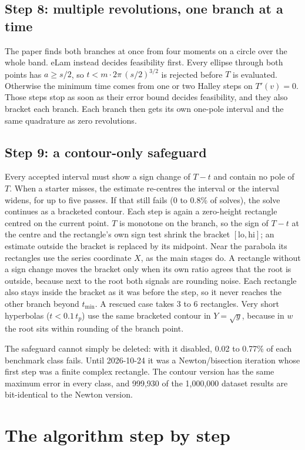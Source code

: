 \documentclass[11pt]{article}
\begin{document}
\subsection*{Step 8: multiple revolutions, one branch at a time}
The paper finds both branches at once from four moments on a circle over the whole band. eLam instead decides feasibility first. Every ellipse through both points has $a \ge s/2$, so $t < m\cdot2\pi\,(s/2)^{3/2}$ is rejected before $T$ is evaluated. Otherwise the minimum time comes from one or two Halley steps on $T'(v)=0$. Those steps stop as soon as their error bound decides feasibility, and they also bracket each branch. Each branch then gets its own one-pole interval and the same quadrature as zero revolutions.

\subsection*{Step 9: a contour-only safeguard}
Every accepted interval must show a sign change of $T-t$ and contain no pole of $T$. When a starter misses, the estimate re-centres the interval or the interval widens, for up to five passes. If that still fails (0 to 0.8\% of solves), the solve continues as a bracketed contour. Each step is again a zero-height rectangle centred on the current point. $T$ is monotone on the branch, so the sign of $T-t$ at the centre and the rectangle's own sign test shrink the bracket $[\text{lo},\text{hi}]$; an estimate outside the bracket is replaced by its midpoint. Near the parabola its rectangles use the series coordinate $X$, as the main stages do. A rectangle without a sign change moves the bracket only when its own ratio agrees that the root is outside, because next to the root both signals are rounding noise. Each rectangle also stays inside the bracket as it was before the step, so it never reaches the other branch beyond $t_\text{min}$. A rescued case takes 3 to 6 rectangles. Very short hyperbolas ($t<0.1\,t_p$) use the same bracketed contour in $Y=\sqrt{y}$, because in $w$ the root sits within rounding of the branch point.

The safeguard cannot simply be deleted: with it disabled, 0.02 to 0.77\% of each benchmark class fails. Until 2026-10-24 it was a Newton/bisection iteration whose first step was a finite complex rectangle. The contour version has the same maximum error in every class, and 999,930 of the 1,000,000 dataset results are bit-identical to the Newton version.

\section{The algorithm step by step}
\end{document}
